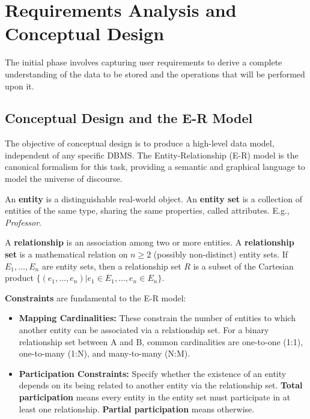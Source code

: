 \section{Requirements Analysis and Conceptual Design}

The initial phase involves capturing user requirements to derive a complete understanding of the data to be stored and the operations that will be performed upon it.

\subsection{Conceptual Design and the E-R Model}
The objective of conceptual design is to produce a high-level data model, independent of any specific DBMS. The Entity-Relationship (E-R) model is the canonical formalism for this task, providing a semantic and graphical language to model the universe of discourse.

\begin{definition}
An \textbf{entity} is a distinguishable real-world object. An \textbf{entity set} is a collection of entities of the same type, sharing the same properties, called attributes. E.g., \textit{Professor}.
\end{definition}

\begin{definition}
A \textbf{relationship} is an association among two or more entities. A \textbf{relationship set} is a mathematical relation on $n \ge 2$ (possibly non-distinct) entity sets. If $E_1, \dots, E_n$ are entity sets, then a relationship set $R$ is a subset of the Cartesian product $\{(e_1, \dots, e_n) | e_1 \in E_1, \dots, e_n \in E_n\}$.
\end{definition}

\noindent\textbf{Constraints} are fundamental to the E-R model:
\begin{itemize}
    \item \textbf{Mapping Cardinalities:} These constrain the number of entities to which another entity can be associated via a relationship set. For a binary relationship set between A and B, common cardinalities are one-to-one (1:1), one-to-many (1:N), and many-to-many (N:M).
    \item \textbf{Participation Constraints:} Specify whether the existence of an entity depends on its being related to another entity via the relationship set. \textbf{Total participation} means every entity in the entity set must participate in at least one relationship. \textbf{Partial participation} means otherwise.
\end{itemize}

